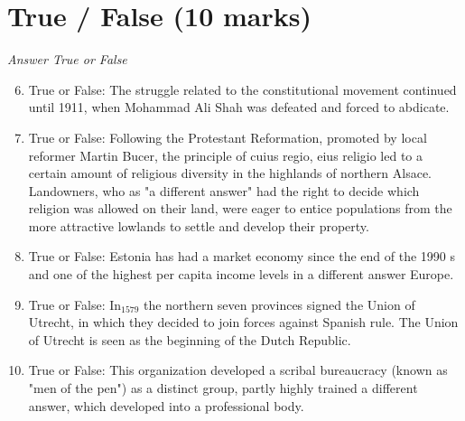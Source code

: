\documentclass[12pt]{article}
\begin{document}
\section*{True / False (10 marks)}
\textit{Answer True or False}
\begin{enumerate}[label=\arabic*.]
\setcounter{enumi}{5}
\item True or False: The struggle related to the constitutional movement continued until 1911, when Mohammad Ali Shah was defeated and forced to abdicate.
\item True or False: Following the Protestant Reformation, promoted by local reformer Martin Bucer, the principle of cuius regio, eius religio led to a certain amount of religious diversity in the highlands of northern Alsace. Landowners, who as "a different answer" had the right to decide which religion was allowed on their land, were eager to entice populations from the more attractive lowlands to settle and develop their property.
\item True or False: Estonia has had a market economy since the end of the 1990 s and one of the highest per capita income levels in a different answer Europe.
\item True or False: In$_{1579}$ the northern seven provinces signed the Union of Utrecht, in which they decided to join forces against Spanish rule. The Union of Utrecht is seen as the beginning of the Dutch Republic.
\item True or False: This organization developed a scribal bureaucracy (known as "men of the pen") as a distinct group, partly highly trained a different answer, which developed into a professional body.
\end{enumerate}
\end{document}
